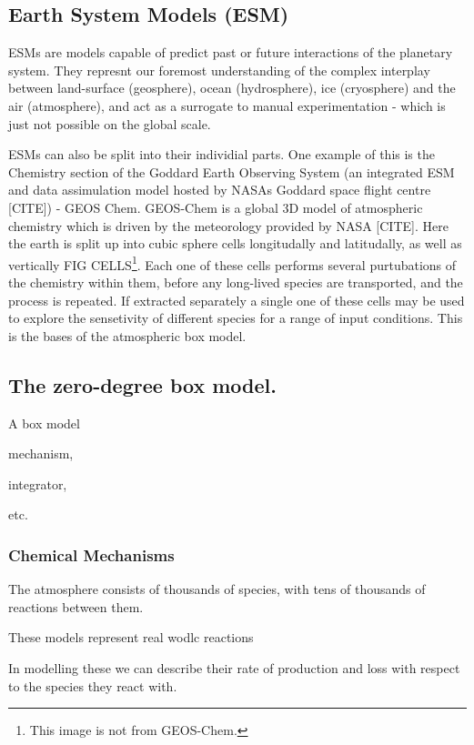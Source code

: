 \subsection{Earth System Models (ESM)}

  ESMs are models capable of predict past or future interactions of the planetary system. They represnt our foremost understanding of the complex interplay between land-surface (geosphere), ocean (hydrosphere), ice (cryosphere) and the air (atmosphere), and act as a surrogate to manual experimentation -  which is just not possible on the global scale.

ESMs can also be split into their individial parts. One example of this is the Chemistry section of the Goddard Earth Observing System (an integrated ESM and data assimulation model hosted by NASAs Goddard space flight centre [CITE]) - GEOS Chem. GEOS-Chem is a global 3D model of atmospheric chemistry which is driven by the meteorology provided by NASA [CITE]. Here the earth is split up into cubic sphere cells longitudally and latitudally, as well as vertically FIG CELLS\footnote{This image is not from GEOS-Chem.}. Each one of these cells performs several purtubations of the chemistry within them, before any long-lived species are transported, and the process is repeated. If extracted separately a single one of these cells may be used to explore the sensetivity of different species for a range of input conditions. This is the bases of the atmospheric box model.


\subsection{The zero-degree box model.}
A box model



mechanism,

integrator,

etc.






\subsubsection{Chemical Mechanisms}
The atmosphere consists of thousands of species, with tens of thousands of reactions between them.

These models represent real wodlc reactions


In modelling these we can describe their rate of production and loss with respect to the species they react with.



